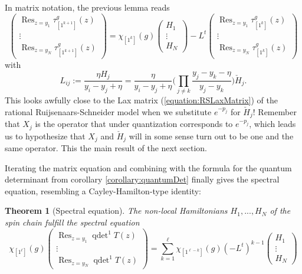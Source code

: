 \documentclass[11pt]{report}
\newtheorem{theorem}{Theorem}[section]
\theoremstyle{definition}
\theoremstyle{remark}
\theoremstyle{remark}
\begin{document}
In matrix notation, the previous lemma reads
\begin{equation*}
\begin{pmatrix}
\operatorname{Res}_{z=y_1} \tau_{[1^{k+1}]}^g(z) \\
\vdots \\
\operatorname{Res}_{z=y_N} \tau_{[1^{k+1}]}^g(z)
\end{pmatrix}
=
\chi_{[1^k]}(g)
\begin{pmatrix}
H_1 \\
\vdots \\
H_N
\end{pmatrix}
-L^t
\begin{pmatrix}
\operatorname{Res}_{z=y_1} \tau_{[1^k]}^g(z) \\
\vdots \\
\operatorname{Res}_{z=y_N} \tau_{[1^k]}^g(z)
\end{pmatrix}
\end{equation*}
with
\begin{equation*}
L_{ij} := \frac{\eta H_j}{y_i-y_j+\eta} = \frac{\eta}{y_i-y_j+\eta} \bigg( \prod_{j \neq k} \frac{y_j-y_k-\eta}{y_j-y_k} \bigg) \check H_j.
\end{equation*}
This looks awfully close to the Lax matrix (\ref{equation:RSLaxMatrix}) of the rational Ruijsenaars-Schneider model when we substitute $e^{-p_j}$ for $\check H_j$! Remember that $X_j$ is the operator that under quantization corresponds to $e^{-p_j}$, which leads us to hypothesize that $X_j$ and $\check H_j$ will in some sense turn out to be one and the same operator. This the main result of the next section.

Iterating the matrix equation and combining with the formula for the quantum determinant from corollary \ref{corollary:quantumDet} finally gives the spectral equation, resembling a Cayley-Hamilton-type identity:

\begin{theorem}[Spectral equation]\label{theorem:spectralEq}
The non-local Hamiltonians $H_1,...,H_N$ of the spin chain fulfill the \emph{spectral equation}
\begin{equation*}
\chi_{[1^\ell]}(g)
\begin{pmatrix}
\operatorname{Res}_{z=y_1} \operatorname{qdet}^1 T(z) \\ \vdots \\ \operatorname{Res}_{z=y_N} \operatorname{qdet}^1 T(z)
\end{pmatrix}
= \sum_{k=1}^\ell \chi_{[1^{\ell-k}]}(g) (-L^t)^{k-1}
\begin{pmatrix}
H_1 \\ \vdots \\ H_N
\end{pmatrix}
\end{equation*}
\end{theorem}
\end{document}

